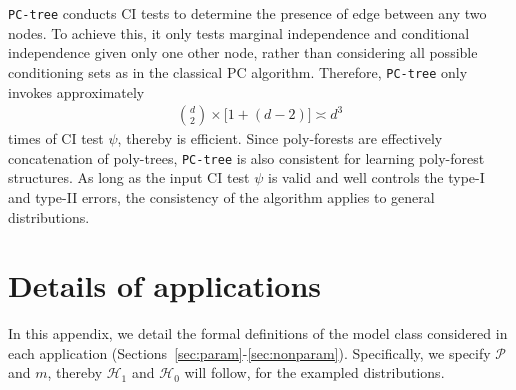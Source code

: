 \documentclass{article}
\theoremstyle{definition}
\theoremstyle{definition}
\theoremstyle{definition}
\theoremstyle{definition}
\theoremstyle{definition}
\theoremstyle{definition}
\theoremstyle{remark}
\theoremstyle{remark}
\newcommand{\dpdm}{m}
\newcommand{\dd}{d}
\newcommand{\hone}{\mathcal{H}_1}
\newcommand{\hzero}{\mathcal{H}_0}
\begin{document}
\texttt{PC-tree} conducts CI tests to determine the presence of edge between any two nodes. To achieve this, it only tests marginal independence and conditional independence given only one other node, rather than considering all possible conditioning sets as in the classical PC algorithm.
Therefore, \texttt{PC-tree} only invokes approximately
\begin{align*}
    \binom{\dd}{2} \times \Big[1 + (d-2)\Big] \asymp \dd^3
\end{align*}
times of CI test $\psi$, thereby is efficient. Since poly-forests are effectively concatenation of poly-trees, \texttt{PC-tree} is also consistent for learning poly-forest structures. As long as the input CI test $\psi$ is valid and well controls the type-I and type-II errors, the consistency of the algorithm applies to general distributions.





\section{Details of applications}\label{app:details}
In this appendix, we detail the formal definitions of the model class considered in each application (Sections~\ref{sec:param}-\ref{sec:nonparam}). Specifically, we specify $\mathcal{P}$ and $\dpdm$, thereby $\hone$ and $\hzero$ will follow, for the exampled distributions.
\end{document}
